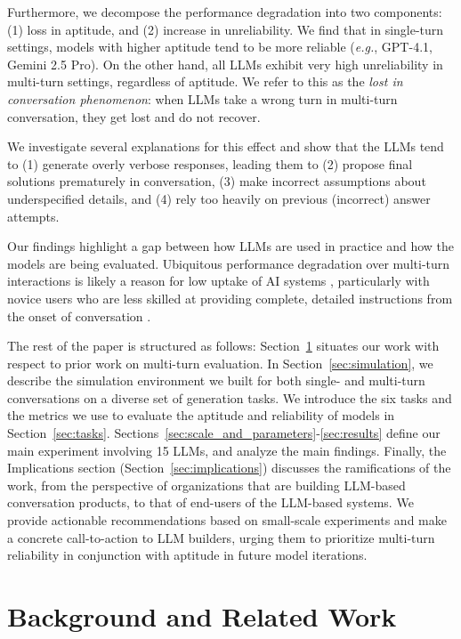 \documentclass{article}
\begin{document}
Furthermore, we decompose the performance degradation into two components: (1) loss in aptitude, and (2) increase in unreliability.
We find that in single-turn settings, models with higher aptitude tend to be more reliable (\textit{e.g.}, GPT-4.1, Gemini 2.5 Pro). 
On the other hand, all LLMs exhibit very high unreliability in multi-turn settings, regardless of aptitude.
We refer to this as the \textit{lost in conversation phenomenon}: when LLMs take a wrong turn in multi-turn conversation, they get lost and do not recover.

We investigate several explanations for this effect and show that the LLMs tend to (1) generate overly verbose responses, leading them to (2) propose final solutions prematurely in conversation, (3) make incorrect assumptions about underspecified details, and (4) rely too heavily on previous (incorrect) answer attempts.

Our findings highlight a gap between how LLMs are used in practice and how the models are being evaluated. Ubiquitous performance degradation over multi-turn interactions is likely a reason for low uptake of AI systems \cite{southworth2023developing,brauner2023what,horowitz2024adopting}, particularly with novice users who are less skilled at providing complete, detailed instructions from the onset of conversation \cite{zamfirescu2023johnny,knoth2024aila}.

The rest of the paper is structured as follows: Section~\ref{sec:background} situates our work with respect to prior work on multi-turn evaluation. In Section~\ref{sec:simulation}, we describe the simulation environment we built for both single- and multi-turn conversations on a diverse set of generation tasks.
We introduce the six tasks and the metrics we use to evaluate the aptitude and reliability of models in Section~\ref{sec:tasks}. Sections~\ref{sec:scale_and_parameters}-\ref{sec:results} define our main experiment involving 15 LLMs, and analyze the main findings.
Finally, the Implications section (Section~\ref{sec:implications}) discusses the ramifications of the work, from the perspective of organizations that are building LLM-based conversation products, to that of end-users of the LLM-based systems.
We provide actionable recommendations based on small-scale experiments and make a concrete call-to-action to LLM builders, urging them to prioritize multi-turn reliability in conjunction with aptitude in future model iterations.

\section{Background and Related Work} \label{sec:background}
\end{document}
